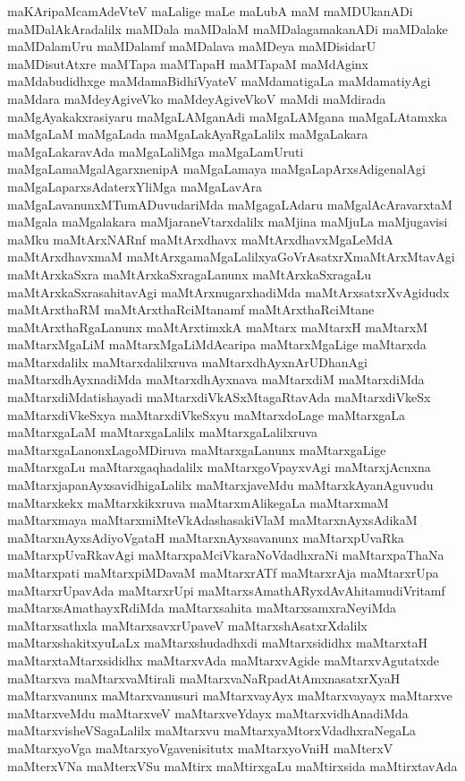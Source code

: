 {maKAripaMcamAdeVteV
maLalige
maLe
maLubA
maM
maMDUkanADi
maMDalAkAradalilx
maMDala
maMDalaM
maMDalagamakanADi
maMDalake
maMDalamUru
maMDalamf
maMDalava
maMDeya
maMDisidarU
maMDisutAtxre
maMTapa
maMTapaH
maMTapaM
maMdAginx
maMdabudidhxge
maMdamaBidhiVyateV
maMdamatigaLa
maMdamatiyAgi
maMdara
maMdeyAgiveVko
maMdeyAgiveVkoV
maMdi
maMdirada
maMgAyakakxrasiyaru
maMgaLAMganAdi
maMgaLAMgana
maMgaLAtamxka
maMgaLaM
maMgaLada
maMgaLakAyaRgaLalilx
maMgaLakara
maMgaLakaravAda
maMgaLaliMga
maMgaLamUruti
maMgaLamaMgalAgarxnenipA
maMgaLamaya
maMgaLapArxsAdigenalAgi
maMgaLaparxsAdaterxYliMga
maMgaLavAra
maMgaLavanunxMTumADuvudariMda
maMgagaLAdaru
maMgalAcAravarxtaM
maMgala
maMgalakara
maMjaraneVtarxdalilx
maMjina
maMjuLa
maMjugavisi
maMku
maMtArxNARnf
maMtArxdhavx
maMtArxdhavxMgaLeMdA
maMtArxdhavxmaM
maMtArxgamaMgaLalilxyaGoVrAsatxrXmaMtArxMtavAgi
maMtArxkaSxra
maMtArxkaSxragaLanunx
maMtArxkaSxragaLu
maMtArxkaSxrasahitavAgi
maMtArxnugarxhadiMda
maMtArxsatxrXvAgidudx
maMtArxthaRM
maMtArxthaRciMtanamf
maMtArxthaRciMtane
maMtArxthaRgaLanunx
maMtArxtimxkA
maMtarx
maMtarxH
maMtarxM
maMtarxMgaLiM
maMtarxMgaLiMdAcaripa
maMtarxMgaLige
maMtarxda
maMtarxdalilx
maMtarxdalilxruva
maMtarxdhAyxnArUDhanAgi
maMtarxdhAyxnadiMda
maMtarxdhAyxnava
maMtarxdiM
maMtarxdiMda
maMtarxdiMdatishayadi
maMtarxdiVkASxMtagaRtavAda
maMtarxdiVkeSx
maMtarxdiVkeSxya
maMtarxdiVkeSxyu
maMtarxdoLage
maMtarxgaLa
maMtarxgaLaM
maMtarxgaLalilx
maMtarxgaLalilxruva
maMtarxgaLanonxLagoMDiruva
maMtarxgaLanunx
maMtarxgaLige
maMtarxgaLu
maMtarxgaqhadalilx
maMtarxgoVpayxvAgi
maMtarxjAcnxna
maMtarxjapanAyxsavidhigaLalilx
maMtarxjaveMdu
maMtarxkAyanAguvudu
maMtarxkekx
maMtarxkikxruva
maMtarxmAlikegaLa
maMtarxmaM
maMtarxmaya
maMtarxmiMteVkAdashasakiVlaM
maMtarxnAyxsAdikaM
maMtarxnAyxsAdiyoVgataH
maMtarxnAyxsavanunx
maMtarxpUvaRka
maMtarxpUvaRkavAgi
maMtarxpaMciVkaraNoVdadhxraNi
maMtarxpaThaNa
maMtarxpati
maMtarxpiMDavaM
maMtarxrATf
maMtarxrAja
maMtarxrUpa
maMtarxrUpavAda
maMtarxrUpi
maMtarxsAmathARyxdAvAhitamudiVritamf
maMtarxsAmathayxRdiMda
maMtarxsahita
maMtarxsamxraNeyiMda
maMtarxsathxla
maMtarxsavxrUpaveV
maMtarxshAsatxrXdalilx
maMtarxshakitxyuLaLx
maMtarxshudadhxdi
maMtarxsididhx
maMtarxtaH
maMtarxtaMtarxsididhx
maMtarxvAda
maMtarxvAgide
maMtarxvAgutatxde
maMtarxva
maMtarxvaMtirali
maMtarxvaNaRpadAtAmxnasatxrXyaH
maMtarxvanunx
maMtarxvanusuri
maMtarxvayAyx
maMtarxvayayx
maMtarxve
maMtarxveMdu
maMtarxveV
maMtarxveYdayx
maMtarxvidhAnadiMda
maMtarxvisheVSagaLalilx
maMtarxvu
maMtarxyaMtorxVdadhxraNegaLa
maMtarxyoVga
maMtarxyoVgavenisitutx
maMtarxyoVniH
maMterxV
maMterxVNa
maMterxVSu
maMtirx
maMtirxgaLu
maMtirxsida
maMtirxtavAda
}
